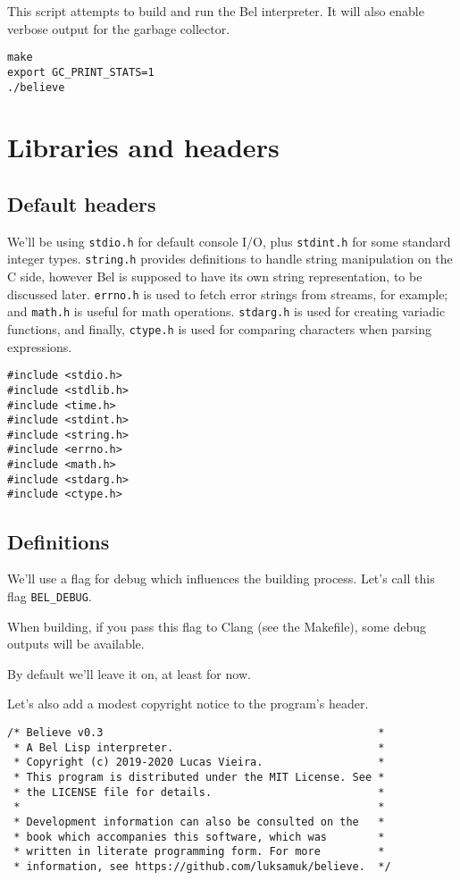 \documentclass[openright,a4paper,twoside,12pt]{memoir}
\begin{document}
This script attempts to build and run the Bel interpreter. It will
also enable verbose output for the garbage collector.

\begin{verbatim}
make
export GC_PRINT_STATS=1
./believe
\end{verbatim}

\chapter{Libraries and headers}
\label{sec:org49f8aad}

\section{Default headers}
\label{sec:org2fd13fc}

We'll be using \texttt{stdio.h} for default console I/O, plus \texttt{stdint.h} for some
standard integer types. \texttt{string.h} provides definitions to handle string
manipulation on the C side, however Bel is supposed to have its own
string representation, to be discussed later. \texttt{errno.h} is used to fetch
error strings from streams, for example; and \texttt{math.h} is useful for math
operations.  \texttt{stdarg.h} is  used  for creating  variadic functions,  and
finally,  \texttt{ctype.h}  is  used  for  comparing  characters  when  parsing
expressions.

\begin{verbatim}
#include <stdio.h>
#include <stdlib.h>
#include <time.h>
#include <stdint.h>
#include <string.h>
#include <errno.h>
#include <math.h>
#include <stdarg.h>
#include <ctype.h>
\end{verbatim}

\section{Definitions}
\label{sec:org74d8c41}

We'll use a flag for debug which influences the building
process. Let's call this flag \texttt{BEL\_DEBUG}.

When building, if you pass this flag to Clang (see the Makefile), some
debug outputs will be available.

By default we'll leave it on, at least for now.

Let's also add a modest copyright notice to the program's header.

\begin{verbatim}
/* Believe v0.3                                           *
 * A Bel Lisp interpreter.                                *
 * Copyright (c) 2019-2020 Lucas Vieira.                  *
 * This program is distributed under the MIT License. See *
 * the LICENSE file for details.                          *
 *                                                        *
 * Development information can also be consulted on the   *
 * book which accompanies this software, which was        * 
 * written in literate programming form. For more         *
 * information, see https://github.com/luksamuk/believe.  */
\end{verbatim}
\end{document}
